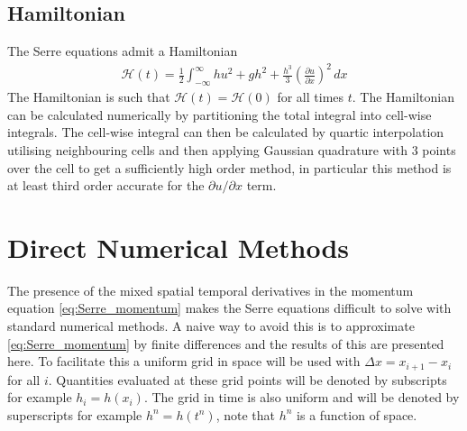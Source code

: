 \documentclass[SingleSpace,12pt,Journal]{Serre_ASCE}
\begin{document}
\subsection{Hamiltonian}

The Serre equations admit a Hamiltonian \cite{Li-Y-2002,Hank-etal-2010-2034,Green-Naghdi-1976-237}
\begin{gather}
\label{eqn:Hamildef}
\mathcal{H}(t) = \frac{1}{2}\int_{-\infty}^{\infty} hu^2 + gh^2 + \frac{h^3}{3} \left(\frac{\partial u}{\partial x}\right)^2\, dx
\end{gather}
The Hamiltonian is such that $\mathcal{H}(t) = \mathcal{H}(0)$ for all times $t$. The Hamiltonian can be calculated numerically by partitioning the total integral into cell-wise integrals. The cell-wise integral can then be calculated by quartic interpolation utilising neighbouring cells and then applying Gaussian quadrature with $3$ points over the cell to get a sufficiently high order method, in particular this method is at least third order accurate for the $\partial u / \partial x$ term. 
\section{Direct Numerical Methods} 
\label{sec:DirNumMet}
The presence of the mixed spatial temporal derivatives in the momentum equation \eqref{eq:Serre_momentum} makes the Serre equations difficult to solve with standard numerical methods. A naive way to avoid this is to approximate \eqref{eq:Serre_momentum} by finite differences and the results of this are presented here. To facilitate this a uniform grid in space will be used with $\Delta x  = x_{i+1} - x_i$ for all $i$. Quantities evaluated at these grid points will be denoted by subscripts for example $h_i = h(x_i)$. The grid in time is also uniform and will be denoted by superscripts for example $h^n = h(t^n)$, note that $h^n$ is a function of space. 
\end{document}
